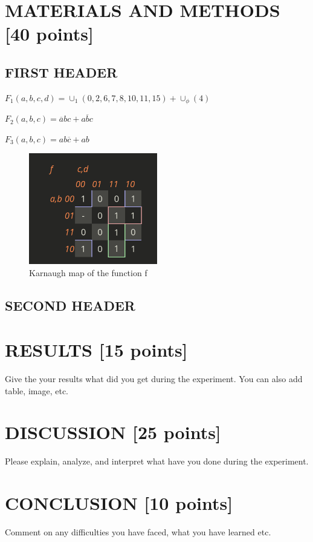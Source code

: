 \documentclass[pdftex,12pt,a4paper]{article}
\begin{document}
\section{MATERIALS AND METHODS [40 points]}



\subsection{FIRST HEADER}
$ F_1 (a, b, c, d) = \cup_1 (0, 2, 6, 7, 8, 10, 11, 15) + \cup_{\phi} (4)$

$F_2 (a, b, c) = \overline{a}bc + a\overline{b}c$

$F_3 (a, b, c) = ab\overline{c} + ab$
	
\begin{figure}[ht]
    \centering
	\includegraphics[width=0.5\textwidth]{map1.png}	
	\caption{Karnaugh map of the function  f\cite{ref1}}
	\label{fig1}
\end{figure}

\subsection{SECOND HEADER}


\section{RESULTS [15 points]}
Give the your results what did you get during the experiment. You can also add table, image, etc. 

\section{DISCUSSION [25 points]}
Please explain, analyze, and interpret what have you done during the  experiment. 

\section{CONCLUSION [10 points]}
Comment on any difficulties you have faced, what you have learned etc.

\newpage
{}



\end{document}
